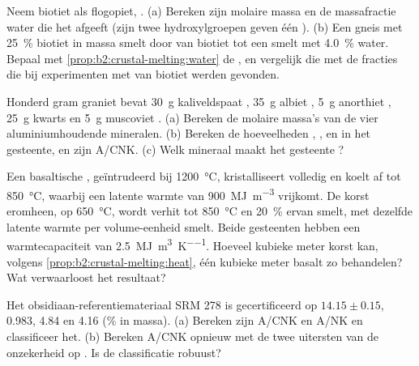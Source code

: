 \begin{exercise}[$\star\star$]\label{exo:b2:crustal-melting:5}
Neem biotiet als flogopiet, . (a) Bereken zijn molaire massa en de
massafractie water die het afgeeft (zijn twee hydroxylgroepen geven één ).
(b) Een gneis met \qty{25}{\percent} biotiet in massa smelt door  van biotiet
tot een smelt met \qty{4.0}{\percent} water. Bepaal met
\cref{prop:b2:crustal-melting:water} de , en vergelijk die met de
fracties die bij experimenten met  van biotiet werden gevonden.
\end{exercise}

\begin{exercise}[$\star\star$]\label{exo:b2:crustal-melting:6}
Honderd gram graniet bevat \qty{30}{\gram} kaliveldspaat ,
\qty{35}{\gram} albiet , \qty{5}{\gram} anorthiet ,
\qty{25}{\gram} kwarts en \qty{5}{\gram} muscoviet .
(a) Bereken de molaire massa's van de vier aluminiumhoudende mineralen. (b) Bereken de hoeveelheden
, ,  en  in het gesteente, en zijn A/CNK. (c) Welk
mineraal maakt het gesteente ?
\end{exercise}

\begin{exercise}[$\star\star$]\label{exo:b2:crustal-melting:7}
Een basaltische , geïntrudeerd bij \qty{1200}{\celsius}, kristalliseert volledig en koelt af tot
\qty{850}{\celsius}, waarbij een latente warmte van \qty{900}{\mega\joule\per\cubic\metre} vrijkomt.
De korst eromheen, op \qty{650}{\celsius}, wordt verhit tot \qty{850}{\celsius} en
\qty{20}{\percent} ervan smelt, met dezelfde latente warmte per volume-eenheid smelt. Beide
gesteenten hebben een warmtecapaciteit van \qty{2.5}{\mega\joule\per\cubic\metre\per\kelvin}. Hoeveel kubieke meter
korst kan, volgens \cref{prop:b2:crustal-melting:heat}, één kubieke meter
basalt zo behandelen? Wat verwaarloost het resultaat?
\end{exercise}

\begin{exercise}[$\star\star$]\label{exo:b2:crustal-melting:8}
Het obsidiaan-referentiemateriaal SRM 278 is gecertificeerd op 
$14.15 \pm 0.15$,  0.983,  4.84 en  4.16 (\unit{\percent} in
massa). (a) Bereken zijn A/CNK en A/NK en classificeer het. (b) Bereken A/CNK opnieuw met de twee
uitersten van de onzekerheid op . Is de classificatie robuust?
\end{exercise}

